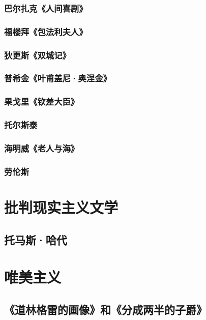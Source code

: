 \documentclass[UTF8]{../RepresentationUniverse}
\begin{document}
\subsubsection{巴尔扎克《人间喜剧》}
\subsubsection{福楼拜《包法利夫人》}
\subsubsection{狄更斯《双城记》}
\subsubsection{普希金《叶甫盖尼·奥涅金》}
\subsubsection{果戈里《钦差大臣》}
\subsubsection{托尔斯泰}
\subsubsection{海明威《老人与海》}
\subsubsection{劳伦斯}



\section{批判现实主义文学}

\subsection{托马斯·哈代}


\section{唯美主义}

\subsection{《道林格雷的画像》和《分成两半的子爵》}
\end{document}
